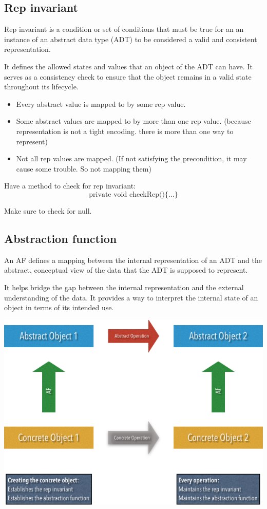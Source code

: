 \documentclass[letterpaper,12pt]{article}
\begin{document}
\subsection{Rep invariant}
Rep invariant is a condition or set of conditions that must be true for an
an instance of an abstract data type (ADT) to be considered a valid and consistent
representation.

It defines the allowed states and values that an object of the ADT can have. It
serves as a consistency check to ensure that the object remains in a valid
state throughout its lifecycle.

\begin{itemize}
      \item Every abstract value is mapped to by some rep value.
      \item Some abstract values are mapped to by more than one rep value. (because
            representation is not a tight encoding. there is more than one way to
            represent)
      \item Not all rep values are mapped. (If not satisfying the precondition, it may
            cause some trouble. So not mapping them)
\end{itemize}

Have a method to check for rep invariant:
\[
      \text{private void checkRep()\{\ldots\}}
\]

Make sure to check for null.

\subsection{Abstraction function}
An AF defines a mapping between the internal representation of an ADT and the
abstract, conceptual view of the data that the ADT is supposed to represent.

It helps bridge the gap between the internal representation and the external
understanding of the data. It provides a way to interpret the internal state of
an object in terms of its intended use.

\includegraphics*[scale=0.8]{./summary_image/Abstract Function Illustration.png}
\end{document}
